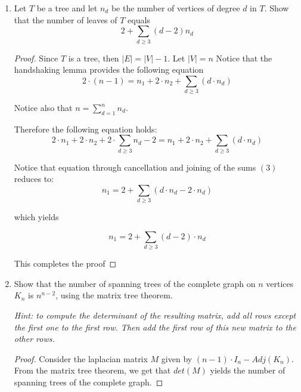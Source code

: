 \documentclass[12pt]{article}
\begin{document}
\begin{enumerate}
    \item Let $T$ be a tree and let $n_d$ be the number of vertices of degree $d$ in $T$. Show that the number of leaves of $T$ equals $$ 2+ \displaystyle \sum \limits_{d\geq 3} (d-2) n_d$$
    
    \begin{proof}
     Since $T$ is a tree, then $\vert E \vert = \vert V \vert -1$. Let $\vert V \vert = n$ Notice that the handshaking lemma provides the following equation 
     \begin{equation}
         2 \cdot (n -1) = n_1+2\cdot n_2+\displaystyle \sum \limits_{d\geq 3} (d \cdot n_d)
     \end{equation}
     
     Notice also that $n = \displaystyle \sum \limits_{d=1}^{n} n_d$.
     
     Therefore the following equation holds:
     \begin{equation}
         2 \cdot n_1 + 2 \cdot n_2 + 2 \cdot \displaystyle \sum \limits_{d \geq 3} n_d - 2 = n_1 + 2 \cdot n_2 + \displaystyle \sum \limits_{d\geq 3} (d \cdot n_d)
     \end{equation}
     
     Notice that equation through cancellation and joining of the sums $(3)$ reduces to:
     \begin{equation}
         n_1 = 2 + \displaystyle \sum \limits_{d\geq 3}(d \cdot n_d - 2 \cdot n_d)
     \end{equation}
     
     which yields
     
     \begin{equation}
         n_1 = 2 + \displaystyle \sum \limits_{d \geq 3}(d-2) \cdot n_d
     \end{equation}
     
     This completes the proof
    \end{proof}
    
    \item Show that the number of spanning trees of the complete graph on $n$ vertices $K_n$ is $n^ {n-2}$, using the matrix tree theorem. 
    
    \textit{Hint: to compute the determinant of the resulting matrix, add all rows except the first one to the first row. Then add the first row of this new matrix to the other rows.}
    
    \begin{proof}
    Consider the laplacian matrix $M$ given by $(n-1)\cdot I_n - Adj(K_n)$. From the matrix tree theorem, we get that $det(M)$ yields the number of spanning trees of the complete graph.
    

\end{proof}
\end{enumerate}
\end{document}
